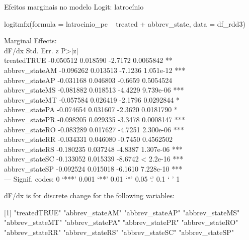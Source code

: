 \documentclass{beamer}
\begin{document}
\begin{frame}{Efeitos marginais no modelo Logit: latrocínio}
	\begin{tiny}
logitmfx(formula = latrocinio_pc ~ treated + abbrev_state, data = df_rdd3)

Marginal Effects:\\
dF/dx Std. Err.       z     P>|z|    \\
treatedTRUE    -0.050512  0.018590 -2.7172 0.0065842 ** \\
abbrev_stateAM -0.096262  0.013513 -7.1236 1.051e-12 ***\\
abbrev_stateAP -0.031168  0.046803 -0.6659 0.5054524    \\
abbrev_stateMS -0.081882  0.018513 -4.4229 9.739e-06 ***\\
abbrev_stateMT -0.057584  0.026419 -2.1796 0.0292844 *  \\
abbrev_statePA -0.074654  0.031607 -2.3620 0.0181790 *  \\
abbrev_statePR -0.098205  0.029335 -3.3478 0.0008147 ***\\
abbrev_stateRO -0.083289  0.017627 -4.7251 2.300e-06 ***\\
abbrev_stateRR -0.034331  0.046080 -0.7450 0.4562502    \\
abbrev_stateRS -0.180235  0.037248 -4.8387 1.307e-06 ***\\
abbrev_stateSC -0.133052  0.015339 -8.6742 < 2.2e-16 ***\\
abbrev_stateSP -0.092524  0.015018 -6.1610 7.228e-10 ***\\
---
Signif. codes:  0 ‘***’ 0.001 ‘**’ 0.01 ‘*’ 0.05 ‘.’ 0.1 ‘ ’ 1

dF/dx is for discrete change for the following variables:

[1] "treatedTRUE"    "abbrev_stateAM" "abbrev_stateAP" "abbrev_stateMS"\\
[5] "abbrev_stateMT" "abbrev_statePA" "abbrev_statePR" "abbrev_stateRO"\\
[9] "abbrev_stateRR" "abbrev_stateRS" "abbrev_stateSC" "abbrev_stateSP"\\
\end{tiny}
\end{frame}
\end{document}

